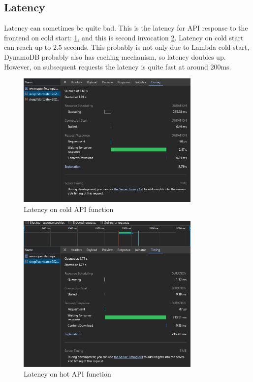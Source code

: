 \subsection{Latency}
Latency can sometimes be quite bad. This is the latency for API response to the frontend on cold start: \ref{fig:latencyBad}, and this is second invocation \ref{fig:latencyGood}. Latency on cold start can reach up to 2.5 seconds. This probably is not only due to Lambda cold start, DynamoDB probably also has caching mechanism, so latency doubles up. However, on subsequent requests the latency is quite fast at around 200ms.   
\begin{figure}
    
    \centering
    \includegraphics[width=0.8\textwidth,keepaspectratio]{../images/latencyBad.png}
    \caption{Latency on cold API function}
    \label{fig:latencyBad}
    
\end{figure}
\begin{figure}
    
    \centering
    \includegraphics[width=0.8\textwidth,keepaspectratio]{../images/latencyGood.png}
    \caption{Latency on hot API function}
    \label{fig:latencyGood}
    
\end{figure}

